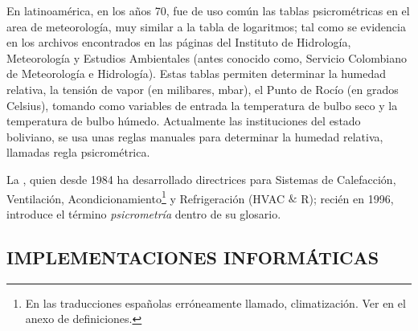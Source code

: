     En latinoamérica, en los años 70, fue de uso común las tablas psicrométricas en el area de meteorología, muy similar a la tabla de logaritmos; tal como se evidencia en los archivos encontrados en las páginas del Instituto de Hidrología, Meteorología y Estudios Ambientales (antes conocido como, Servicio Colombiano de Meteorología e Hidrología). Estas tablas permiten determinar la humedad relativa, la tensión de vapor (en milibares, \unit{mbar}), el Punto de Rocío (en grados Celsius), tomando como variables de entrada la temperatura de bulbo seco y la temperatura de bulbo húmedo. Actualmente las instituciones del estado boliviano, se usa unas reglas manuales para determinar la humedad relativa, llamadas regla psicrométrica.

    La , quien desde 1984 ha desarrollado directrices para Sistemas de Calefacción, Ventilación, Acondicionamiento\footnote[1]{En las traducciones españolas erróneamente llamado, climatización. Ver en el anexo de definiciones.} y Refrigeración (HVAC $\&$ R); recién en 1996, introduce el término \textit{psicrometría} dentro de su glosario.





    \subsection{IMPLEMENTACIONES INFORMÁTICAS}

